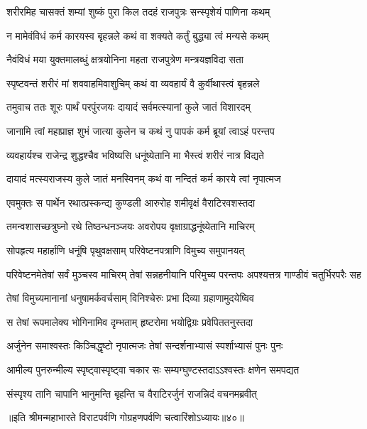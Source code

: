 \twolineshloka
{शरीरमिह चासक्तं शम्यां शुष्कं पुरा किल}
{तदहं राजपुत्रः सन्स्पृशेयं पाणिना कथम्}


\twolineshloka
{न मामेवंविधं कर्म कारयस्व बृहन्नले}
{कथं वा शक्यते कर्तुं बुद्ध्या त्वं मन्यसे कथम्}


\twolineshloka
{नैवंविधं मया युक्तमालब्धुं क्षत्रयोनिना}
{महता राजपुत्रेण मन्त्रयज्ञविदा सता}


\twolineshloka
{स्पृष्टवन्तं शरीरं मां शववाहमिवाशुचिम्}
{कथं वा व्यवहार्यं वै कुर्वीथास्त्वं बृहन्नले}



\twolineshloka
{तमुवाच ततः शूरः पार्थं परपुंरजयः}
{दायादं सर्वमत्स्यानां कुले जातं विशारदम्}


\twolineshloka
{जानामि त्वां महाप्राज्ञ शुभं जात्या कुलेन च}
{कथं नु पापकं कर्म ब्रूयां त्वाऽहं परन्तप}


\twolineshloka
{व्यवहार्यश्च राजेन्द्र शुद्धश्चैव भविष्यसि}
{धनूंष्येतानि मा भैस्त्वं शरीरं नात्र विद्यते}


\twolineshloka
{दायादं मत्स्यराजस्य कुले जातं मनस्विनम्}
{कथं वा नन्दितं कर्म कारये त्वां नृपात्मज}



\twolineshloka
{एवमुक्तः स पार्थेन रथात्प्रस्कन्द्य कुण्डली}
{आरुरोह शमीवृक्षं वैराटिरवशस्तदा}


\twolineshloka
{तमन्वशासच्छत्रुघ्नो रथे तिष्ठन्धनञ्जयः}
{अवरोपय वृक्षाग्राद्धनूंष्येतानि माचिरम्}


\twolineshloka
{सोपहृत्य महार्हाणि धनूंषि पृथुवक्षसाम्}
{परिवेष्टनपत्राणि विमुच्य समुपानयत्}


\threelineshloka
{परिवेष्टनमेतेषां सर्वं मुञ्चस्व माचिरम्}
{तेषां सन्नहनीयानि परिमुच्य परन्तपः}
{अपश्यत्तत्र गाण्डीवं चतुर्भिरपरैः सह}


\twolineshloka
{तेषां विमुच्यमानानां धनुषामर्कवर्चसाम्}
{विनिश्चेरुः प्रभा दिव्या ग्रहाणामुदयेष्विव}


\twolineshloka
{स तेषां रूपमालेक्य भोगिनामिव दृम्भताम्}
{हृष्टरोमा भयोद्विग्रः प्रवेपिततनुस्तदा}


\twolineshloka
{अर्जुनेन समाश्वस्तः किञ्चिद्धृष्टो नृपात्मजः}
{तेषां सन्दर्शनाभ्यासं स्पर्शाभ्यासं पुनः पुनः}


\twolineshloka
{आमील्य पुनरुन्मील्य स्पृष्ट्वास्पृष्ट्वा चकार सः}
{सम्यग्घुण्टस्तदाऽऽश्वस्तः क्षणेन समपद्यत}


\twolineshloka
{संस्पृश्य तानि चापानि भानुमन्ति बृहन्ति च}
{वैराटिरर्जुनं राजन्निदं वचनमब्रवीत्}

॥इति श्रीमन्महाभारते विराटपर्वणि गोग्रहणपर्वणि चत्वारिंशोऽध्यायः॥४०॥

